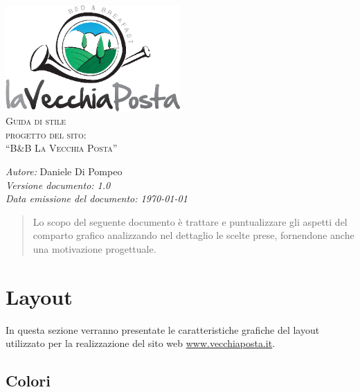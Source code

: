 \documentclass[a4paper,12pt,hidelinks]{report}
\begin{document}
  \begin{titlepage}
    \begin{center}
      \includegraphics[width=0.5\textwidth,keepaspectratio=true]{../img/logo}\\[1cm]    
      \textsc{\LARGE Guida di stile}\\[0.6cm]
      \textsc{\LARGE  progetto del sito:\\[0.5cm] ``B\&B La Vecchia Posta''}\\ [2.0cm]

      \begin{minipage}{0.8\textwidth}
	\begin{flushleft} \large
	  \emph{Autore:} Daniele Di Pompeo \\[0.5cm]
	  \emph{Versione documento: 1.0}\\[0.5cm]
	  \emph{Data emissione del documento: \today}\\[0.5cm]
	\end{flushleft}
      \end{minipage}
    \end{center}
  \end{titlepage}

 
\begin{abstract}
 Lo scopo del seguente documento è trattare e puntualizzare gli aspetti del comparto grafico analizzando nel dettaglio le scelte prese, fornendone anche una motivazione
 progettuale.
\end{abstract}

\section*{Layout}
In questa sezione verranno presentate le caratteristiche grafiche del layout utilizzato per la realizzazione del sito web \url{www.vecchiaposta.it}.

\subsection*{Colori}
\end{document}
